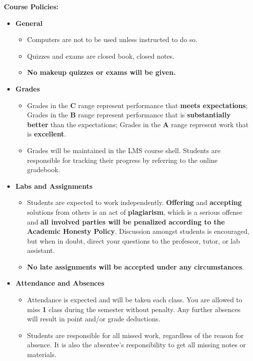 \documentclass[11pt]{article}
\begin{document}
\textbf {\large Course Policies:}
\begin{itemize}
	\item \textbf {General}
		\begin{itemize}
			\item Computers are not to be used unless instructed to do so.
			\item Quizzes and exams are closed book, closed notes.
			\item \textbf {No makeup quizzes or exams will be given.}
		\end{itemize}
	\item \textbf {Grades}
		\begin{itemize}
			\item Grades in the \textbf{C} range represent performance that \textbf{meets expectations}; Grades in the \textbf{B} range represent performance that is \textbf{substantially better} than the expectations; Grades in the \textbf{A} range represent work that is \textbf{excellent}.
			\item Grades will be maintained in the LMS course shell. Students are responsible for tracking their progress by referring to the online gradebook.
		\end{itemize}
	\item \textbf {Labs and Assignments}
		\begin{itemize}
			\item Students are expected to work independently. \textbf{Offering} and \textbf{accepting} solutions from others is an act of \textbf{plagiarism}, which is a serious offense and \textbf{all involved parties will be penalized according to the Academic Honesty Policy}. Discussion amongst students is encouraged, but when in doubt, direct your questions to the professor, tutor, or lab assistant.
			\item \textbf{No late assignments will be accepted under any circumstances}.
		\end{itemize}
	\item \textbf{Attendance and Absences}
		\begin{itemize}
			\item Attendance is expected and will be taken each class. You are allowed to miss \textbf{1} class during the semester without penalty. Any further absences will result in point and/or grade deductions.
			\item Students are responsible for all missed work, regardless of the reason for absence. It is also the absentee's responsibility to get all missing notes or materials. 
		\end{itemize}
\end{itemize}
\end{document}
